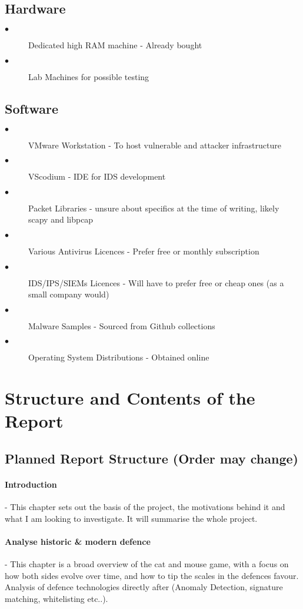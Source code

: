 \subsection{Hardware}
\begin{description}
	\item[$\bullet$] Dedicated high RAM machine - Already bought
	\item[$\bullet$] Lab Machines for possible testing
\end{description}

\subsection{Software}
\begin{description}
	\item[$\bullet$] VMware Workstation - To host vulnerable and attacker infrastructure
	\item[$\bullet$] VScodium - IDE for IDS development
	\item[$\bullet$] Packet Libraries - unsure about specifics at the time of writing, likely scapy and libpcap
	\item[$\bullet$] Various Antivirus Licences - Prefer free or monthly subscription
	\item[$\bullet$] IDS/IPS/SIEMs Licences - Will have to prefer free or cheap ones (as a small company would)
	\item[$\bullet$] Malware Samples - Sourced from Github collections
	\item[$\bullet$] Operating System Distributions - Obtained online 
\end{description}

\section{Structure and Contents of the Report}
\subsection{Planned Report Structure (Order may change)}


\paragraph{Introduction} - This chapter sets out the basis of the project, the motivations behind it and what I am looking to investigate. 
It will summarise the whole project.

\paragraph{Analyse historic \& modern defence} - This chapter is a broad overview of the cat and mouse game, with a focus on how both sides evolve over time, 
and how to tip the scales in the defences favour. Analysis of defence technologies directly after (Anomaly Detection, signature matching, whitelisting etc..). 

